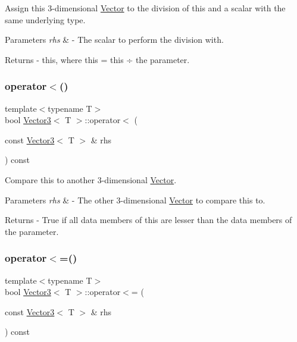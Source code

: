 Assign this 3-\/dimensional \mbox{\hyperlink{class_vector}{Vector}} to the division of this and a scalar with the same underlying type. 
\begin{DoxyParams}{Parameters}
{\em rhs} & -\/ The scalar to perform the division with. \\
\hline
\end{DoxyParams}
\begin{DoxyReturn}{Returns}
-\/ this, where \textquotesingle{}this = this ÷ the parameter\textquotesingle{}. 
\end{DoxyReturn}
\mbox{\label{class_vector3_ae62b088c2abf8ad6620d83565812ad60}} 
\subsubsection{\texorpdfstring{operator$<$()}{operator<()}}
{\footnotesize\ttfamily template$<$typename T$>$ \\
bool \mbox{\hyperlink{class_vector3}{Vector3}}$<$ T $>$\+::operator$<$ (\begin{DoxyParamCaption}\item[{const \mbox{\hyperlink{class_vector3}{Vector3}}$<$ T $>$ \&}]{rhs }\end{DoxyParamCaption}) const}

Compare this to another 3-\/dimensional \mbox{\hyperlink{class_vector}{Vector}}. 
\begin{DoxyParams}{Parameters}
{\em rhs} & -\/ The other 3-\/dimensional \mbox{\hyperlink{class_vector}{Vector}} to compare this to. \\
\hline
\end{DoxyParams}
\begin{DoxyReturn}{Returns}
-\/ True if all data members of this are lesser than the data members of the parameter. 
\end{DoxyReturn}
\mbox{\label{class_vector3_ac7cd56bfa861b5f99b3891f220f86d44}} 
\subsubsection{\texorpdfstring{operator$<$=()}{operator<=()}}
{\footnotesize\ttfamily template$<$typename T$>$ \\
bool \mbox{\hyperlink{class_vector3}{Vector3}}$<$ T $>$\+::operator$<$= (\begin{DoxyParamCaption}\item[{const \mbox{\hyperlink{class_vector3}{Vector3}}$<$ T $>$ \&}]{rhs }\end{DoxyParamCaption}) const}

